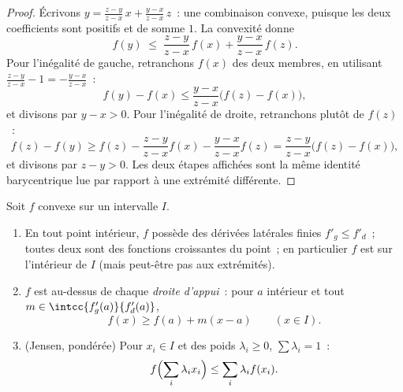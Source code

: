 \begin{proof}
Écrivons $y = \frac{z - y}{z - x}\,x + \frac{y - x}{z - x}\,z$~: une
combinaison convexe, puisque les deux coefficients sont positifs et
de somme $1$. La convexité donne
\[
f(y) \;\leq\; \frac{z-y}{z-x}\,f(x) + \frac{y-x}{z-x}\,f(z).
\]
Pour l'inégalité de gauche, retranchons $f(x)$ des deux membres, en
utilisant $\frac{z-y}{z-x} - 1 = -\frac{y-x}{z-x}$~:
\[
f(y) - f(x) \leq \frac{y - x}{z - x}\bigl(f(z) - f(x)\bigr),
\]
et divisons par $y - x > 0$. Pour l'inégalité de droite, retranchons
plutôt de $f(z)$~:
\[
f(z) - f(y) \geq f(z) - \frac{z-y}{z-x}f(x) -
\frac{y-x}{z-x}f(z)
= \frac{z - y}{z - x}\bigl(f(z) - f(x)\bigr),
\]
et divisons par $z - y > 0$. Les deux étapes affichées sont la même
identité barycentrique lue par rapport à une extrémité différente.
\end{proof}

\begin{theorem}\label{thm:b2:realfun:convexreg}
Soit $f$ convexe sur un intervalle $I$.
\begin{enumerate}
  \item En tout point intérieur, $f$ possède des dérivées latérales
        finies $f'_g \leq f'_d$~; toutes deux sont des fonctions
        croissantes du point~; en particulier $f$ est  sur
        l'intérieur de $I$ (mais peut-être pas aux extrémités).
  \item $f$ est au-dessus de chaque \emph{droite d'appui}~: pour $a$
        intérieur et tout $m \in \intcc{f'_g(a)}{f'_d(a)}$,
        \[
        f(x) \geq f(a) + m(x - a) \qquad (x \in I).
        \]
  \item (Jensen, pondérée) Pour $x_i \in I$ et des poids $\lambda_i
        \geq 0$, $\sum\lambda_i = 1$~:
        \[
        f\Bigl(\sum_i \lambda_i x_i\Bigr) \leq \sum_i \lambda_i
        f(x_i) .\index{inégalité de Jensen}
        \]
\end{enumerate}
\end{theorem}

